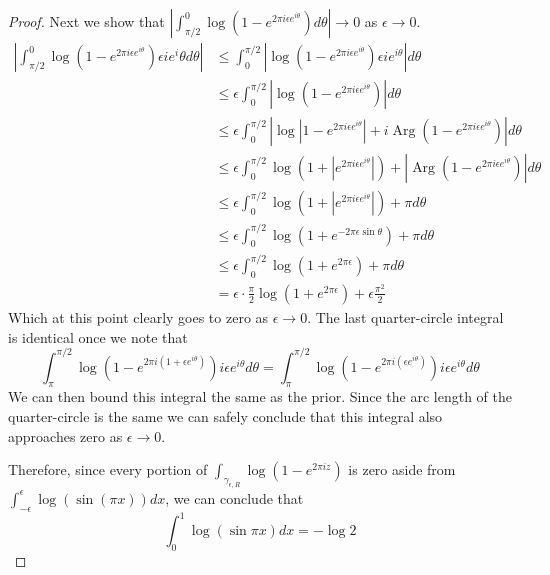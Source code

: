 \documentclass[10pt]{article}
\DeclareMathOperator{\Arg}{Arg}
\theoremstyle{remark}
\theoremstyle{remark}
\begin{document}
\begin{proof}
  Next we show that $\left|\int_{\pi/2}^0\log\left(1-e^{2\pi i \epsilon e^{i\theta}}\right) d\theta\right|\rightarrow 0$ as $\epsilon\rightarrow 0$.
  \begin{align*}
    \left|\int_{\pi/2}^0\log\left(1-e^{2\pi i \epsilon e^{i\theta}}\right) \epsilon ie^i\theta d\theta\right| &\leq \int_0^{\pi/2}\left|\log\left(1-e^{2\pi i \epsilon e^{i\theta}}\right)\epsilon ie^{i\theta}\right|d\theta\\
                                                       &\leq\epsilon\int_0^{\pi/2}\left|\log\left(1-e^{2\pi i \epsilon e^{i\theta}}\right)\right|d\theta\\
                                           &\leq \epsilon\int_0^{\pi/2}\left|\log\left|1-e^{2\pi i \epsilon e^{i\theta}}\right|+i\Arg\left(1-e^{2\pi i \epsilon e^{i\theta}}\right)\right|d\theta\\
                                                       &\leq \epsilon\int_0^{\pi/2}\log\left(1+\left|e^{2\pi i\epsilon e^{i\theta}}\right|\right)+\left|\Arg\left(1-e^{2\pi i \epsilon e^{i\theta}}\right)\right|d\theta\\
                                                       &\leq\epsilon\int_0^{\pi/2}\log\left(1+\left|e^{2\pi i\epsilon e^{i\theta}}\right|\right)+\pi d\theta\\
                                                       &\leq\epsilon\int_0^{\pi/2}\log\left(1+e^{-2\pi \epsilon\sin\theta}\right)+\pi d\theta\\
                                                       &\leq\epsilon\int_0^{\pi/2}\log\left(1+e^{2\pi \epsilon}\right)+\pi d\theta\\
                                                       &= \epsilon\cdot\frac{\pi}{2}\log\left(1+e^{2\pi\epsilon}\right)+\epsilon\frac{\pi^2}{2}
  \end{align*}
  Which at this point clearly goes to zero as $\epsilon\rightarrow 0$. The last quarter-circle integral is identical
  once we note that
  \[
    \int_{\pi}^{\pi/2}\log\left(1-e^{2\pi i\left(1+\epsilon e^{i\theta}\right)}\right)i\epsilon e^{i\theta}d\theta =  \int_{\pi}^{\pi/2}\log\left(1-e^{2\pi i\left(\epsilon e^{i\theta}\right)}\right)i\epsilon e^{i\theta}d\theta
  \]
  We can then bound this integral the same as the prior. Since the arc length of the quarter-circle
  is the same we can safely conclude that this integral also approaches zero as $\epsilon\rightarrow 0$.

  Therefore, since every portion of $\int_{\gamma_{\epsilon,R}}\log\left(1-e^{2\pi i z}\right)$ is zero aside from
  $\int_{-\epsilon}^\epsilon\log\left(\sin\left(\pi x\right)\right)dx$, we can conclude that
  \[
    \int_0^1\log\left(\sin\pi x\right)dx = -\log 2
  \]
\end{proof}
\end{document}
